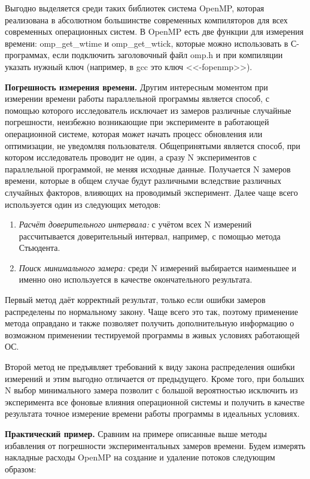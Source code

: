 Выгодно выделяется среди таких библиотек система OpenMP, которая реализована в абсолютном большинстве современных компиляторов для всех современных операционных систем. В OpenMP есть две функции для измерения времени: omp\_get\_wtime и omp\_get\_wtick, которые можно использовать в С-программах, если подключить заголовочный файл omp.h и при компиляции указать нужный ключ (например, в gcc это ключ <<-fopenmp>>).

\textbf{Погрешность измерения времени.} Другим интересным моментом при измерении времени работы параллельной программы является способ, с помощью которого исследователь исключает из замеров различные случайные погрешности, неизбежно возникающие при эксперименте в работающей операционной системе, которая может начать процесс обновления или оптимизации, не уведомляя пользователя. Общепринятыми является способ, при котором исследователь проводит не один, а сразу N экспериментов с параллельной программой, не меняя исходные данные. Получается N замеров времени, которые в общем случае будут различными вследствие различных случайных факторов, влияющих на проводимый эксперимент. Далее чаще всего используется один из следующих методов:

\begin{enumerate}
    \item\textit{Расчёт доверительного интервала:} с учётом всех N измерений рассчитывается доверительный интервал, например, с помощью метода Стьюдента.
    \item\textit{Поиск минимального замера:} среди N измерений выбирается наименьшее и именно оно используется в качестве окончательного результата.
\end{enumerate}

Первый метод даёт корректный результат, только если ошибки замеров распределены по нормальному закону. Чаще всего это так, поэтому применение метода оправдано и также позволяет получить дополнительную информацию о возможном применении тестируемой программы в живых условиях работающей ОС.

Второй метод не предъявляет требований к виду закона распределения ошибки измерений и этим выгодно отличается от предыдущего. Кроме того, при больших N выбор минимального замера позволит с большой вероятностью исключить из эксперимента все фоновые влияния операционной системы и получить в качестве результата точное измерение времени работы программы в идеальных условиях. 

\textbf{Практический пример.} Сравним на примере описанные выше методы избавления от погрешности экспериментальных замеров времени. Будем измерять накладные расходы OpenMP на создание и удаление потоков следующим образом:

